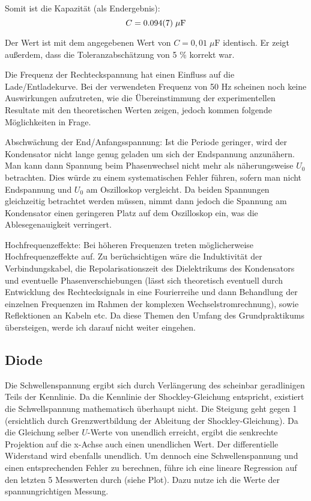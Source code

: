 Somit ist die Kapazität (als Endergebnis):
\begin{equation}
  C = \num{0.094+-0.007} \;\mu\text{F}
\end{equation}

Der Wert ist mit dem angegebenen Wert von $C = 0{,}01 \; \mu\text{F}$
identisch. Er zeigt außerdem, dass die Toleranzabschätzung von 5 \% korrekt
war.

Die Frequenz der Rechteckspannung hat einen Einfluss auf die
Lade/Entladekurve. Bei der verwendeten Frequenz von 50 Hz scheinen noch keine
Auswirkungen aufzutreten, wie die Übereinstimmung der experimentellen Resultate
mit den theoretischen Werten zeigen, jedoch kommen folgende Möglichkeiten in
Frage.

Abschwächung der End/Anfangsspannung: Ist die Periode geringer, wird der
Kondensator nicht lange genug geladen um sich der Endspannung anzunähern. Man
kann dann Spannung beim Phasenwechsel nicht mehr als näherungsweise $U_0$
betrachten. Dies würde zu einem systematischen Fehler führen, sofern man nicht
Endspannung und $U_0$ am Oszilloskop vergleicht. Da beiden Spannungen
gleichzeitig betrachtet werden müssen, nimmt dann jedoch die Spannung am
Kondensator einen geringeren Platz auf dem Oszilloskop ein, was die
Ablesegenauigkeit verringert.

Hochfrequenzeffekte: Bei höheren Frequenzen treten möglicherweise
Hochfrequenzeffekte auf. Zu berüchsichtigen wäre die Induktivität der
Verbindungskabel, die Repolarisationszeit des Dielektrikums des Kondensators
und eventuelle Phasenverschiebungen (lässt sich theoretisch eventuell durch
Entwicklung des Rechtecksignals in eine Fourierreihe und dann Behandlung der
einzelnen Frequenzen im Rahmen der komplexen Wechselstromrechnung), sowie
Reflektionen an Kabeln etc. Da diese Themen den Umfang des Grundpraktikums
übersteigen, werde ich darauf nicht weiter eingehen.

\subsection{Diode}

Die Schwellenspannung ergibt sich durch Verlängerung des scheinbar geradlinigen
Teils der Kennlinie. Da die Kennlinie der Shockley-Gleichung entspricht,
existiert die Schwellspannung mathematisch überhaupt nicht. Die Steigung geht
gegen 1 (ersichtlich durch Grenzwertbildung der Ableitung der
Shockley-Gleichung). Da die Gleichung selber $U$-Werte von unendlich erreicht,
ergibt die senkrechte Projektion auf die x-Achse auch einen unendlichen Wert.
Der differentielle Widerstand wird ebenfalls unendlich. Um dennoch eine
Schwellenspannung und einen entsprechenden Fehler zu berechnen, führe ich eine
lineare Regression auf den letzten 5 Messwerten durch (siehe Plot). Dazu nutze
ich die Werte der spannungrichtigen Messung.

